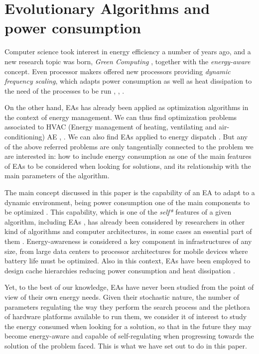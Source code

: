 \section{Evolutionary Algorithms and power consumption}
\label{eas}

Computer science took interest in energy efficiency a number of years
ago, and a new research topic was born, \textit{Green Computing}
\cite{green-computing}, together with the \textit{energy-aware}
\cite{energyaware,energy-aware} concept. Even processor 
makers offered new processors providing \textit{dynamic frequency
  scaling}, which adapts power consumption as well as heat dissipation
to the need of the processes to be run \cite{scaling},
\cite{dynamic-scaling}, \cite{energy-efficient}. 

On the other hand, EAs has already been applied as optimization
algorithms in the context of energy management.  We can thus find
optimization problems associated to HVAC (Energy management of
heating, ventilating and air-conditioning) AE \cite{HVAC},
\cite{chiller}.  We can also find EAs applied to energy dispatch
\cite{dispatch}.  But any of the above referred problems are only
tangentially connected to the problem we are interested in:  how to
include energy consumption as one of the main features of EAs to be
considered when looking for solutions, and its relationship with the
main parameters of the algorithm. 

The main concept discussed in this paper is the capability of an EA to adapt
to a dynamic environment, being power consumption one of the main
components to be optimized \cite{ephemeral}. This capability, which
is one of the \textit{self*} features of a
given algorithm, including EAs \cite{self}, has already been
considered by researchers in other kind of algorithms and computer architectures, in some cases
an essential part of them \cite{energy-aware}. Energy-awareness is
considered a key
component in infrastructures of any size, from large data centers to
processor architectures for mobile devices where battery life must be
optimized.  Also in this context, EAs have been employed to design
cache hierarchies reducing power consumption and heat dissipation
\cite{cache}. 

Yet, to the best of our knowledge, EAs have never been studied from
the point of view of their own energy needs. 
Given their stochastic nature, the number of parameters regulating the
way they perform the search process and the plethora of hardware
platforms available to run them, we consider it of interest to study
the energy consumed when looking for a solution, so that in the future
they may become energy-aware and capable of self-regulating when
progressing towards the solution of the problem faced. This is what we
have set out to do in this paper.

